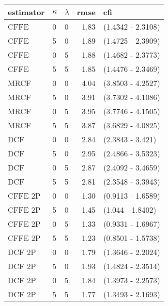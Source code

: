 \begin{tabular}{lllrl}
  \hline
estimator & $\kappa$ & $\lambda$ & rmse & cfi \\ 
  \hline
CFFE  & 0 & 0 & 1.83 & (1.4342 - 2.3108) \\ 
  CFFE  & 5 & 0 & 1.89 & (1.4725 - 2.3909) \\ 
  CFFE  & 0 & 5 & 1.88 & (1.4682 - 2.3773) \\ 
  CFFE  & 5 & 5 & 1.85 & (1.4476 - 2.3469) \\ 
  MRCF  & 0 & 0 & 4.04 & (3.8503 - 4.2527) \\ 
  MRCF  & 5 & 0 & 3.91 & (3.7302 - 4.1086) \\ 
  MRCF  & 0 & 5 & 3.95 & (3.7746 - 4.1505) \\ 
  MRCF  & 5 & 5 & 3.87 & (3.6829 - 4.0825) \\ 
  DCF  & 0 & 0 & 2.84 & (2.3843 - 3.421) \\ 
  DCF  & 5 & 0 & 2.95 & (2.4866 - 3.5323) \\ 
  DCF  & 0 & 5 & 2.87 & (2.4092 - 3.4659) \\ 
  DCF  & 5 & 5 & 2.81 & (2.3548 - 3.3943) \\ 
  CFFE 2P  & 0 & 0 & 1.30 & (0.9113 - 1.6589) \\ 
  CFFE 2P  & 5 & 0 & 1.45 & (1.044 - 1.8402) \\ 
  CFFE 2P  & 0 & 5 & 1.33 & (0.9331 - 1.6967) \\ 
  CFFE 2P  & 5 & 5 & 1.23 & (0.8501 - 1.5738) \\ 
  DCF 2P  & 0 & 0 & 1.79 & (1.3646 - 2.2024) \\ 
  DCF 2P  & 5 & 0 & 1.93 & (1.4824 - 2.3514) \\ 
  DCF 2P  & 0 & 5 & 1.84 & (1.3973 - 2.2573) \\ 
  DCF 2P  & 5 & 5 & 1.77 & (1.3493 - 2.1693) \\ 
   \hline
\end{tabular}
